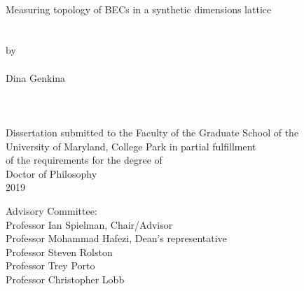 
\thispagestyle{empty}
\hbox{\ }
\vspace{1in}
\renewcommand{\baselinestretch}{1}
\small\normalsize
\begin{center}

\large{{Measuring topology of BECs in a synthetic dimensions lattice}}\\
\ \\
\ \\
\large{by} \\
\ \\
\large{Dina Genkina}%
\ \\
\ \\
\ \\
\ \\
\normalsize
Dissertation submitted to the Faculty of the Graduate School of the \\
University of Maryland, College Park in partial fulfillment \\
of the requirements for the degree of \\
Doctor of Philosophy \\
2019
\end{center}

\vspace{7.5em}

\noindent Advisory Committee: \\
Professor Ian Spielman, Chair/Advisor \\
Professor Mohammad Hafezi, Dean's representative\\
Professor Steven Rolston\\
Professor Trey Porto\\
Professor Christopher Lobb

